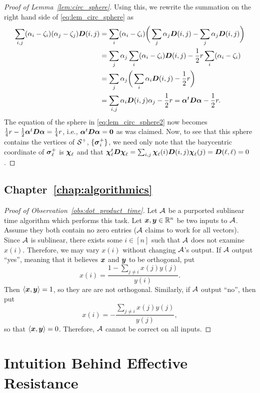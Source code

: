 \begin{proof}[Proof of Lemma~\ref{lem:circ_sphere}]
	Using this, we rewrite the summation on the right hand side of \eqref{eq:lem_circ_sphere} as 
	\begin{align*}
	\sum_{i,j}(\alpha_i-\zeta_i)(\alpha_j-\zeta_j)\vb*{D}(i,j) &= \sum_i (\alpha_i-\zeta_i) \bigg(\sum_j\alpha_j \vb*{D}(i,j) - \sum_j \alpha_j \vb*{D}(i,j)\bigg) \\
	&= \sum_j\alpha_j \sum_i (\alpha_i-\zeta_i)\vb*{D}(i,j) - \frac{1}{2}r \sum_i (\alpha_i-\zeta_i) \\
	&= \sum_j \alpha_j \bigg(\sum_i \alpha_i \vb*{D}(i,j) - \frac{1}{2}r \bigg) \\
	&= \sum_{i,j} \alpha_i \vb*{D}(i,j) \alpha_j -\frac{1}{2}r= \vb*{\alpha}^t \vb*{D}\vb*{\alpha} - \frac{1}{2}r.
	\end{align*}
	The equation of the sphere in \eqref{eq:lem_circ_sphere2} now becomes $\frac{1}{4}r - \frac{1}{2}\vb*{\alpha}^t \vb*{D}\vb*{\alpha} = \frac{1}{4}r$, i.e., $\vb*{\alpha}^t \vb*{D}\vb*{\alpha}=\vb{0}$ as was claimed.  Now, to see that this sphere contains the vertices of $\mathcal{S}^+$,  $\{\vb*{\sigma}_i^+\}$, we need only note that the barycentric coordinate of $\vb*{\sigma}_\ell^+$ is $\boldsymbol{\chi}_\ell$ and that $\boldsymbol{\chi}_\ell^t \vb*{D} \boldsymbol{\chi}_\ell = \sum_{i,j} \boldsymbol{\chi}_\ell(i) \vb*{D}(i,j) \boldsymbol{\chi}_\ell(j) = \vb*{D}(\ell,\ell) = 0$. 
\end{proof}



\section{Chapter~\ref{chap:algorithmics}}
\label{sec:app_proofs_alg}
\begin{proof}[Proof of Observation~\ref{obs:dot_product_time}]
	Let $\mathcal{A}$ be a purported sublinear time algorithm which performs this  task. Let $\vb*{x},\vb*{y}\in\mathbb{R}^n$ be  two inputs  to  $\mathcal{A}$. Assume they  both  contain no zero entries ($\mathcal{A}$ claims to work  for  all vectors). Since  $\mathcal{A}$ is sublinear, there exists some $i\in[n]$ such that $\mathcal{A} $ does not  examine $x(i)$. Therefore,  we may  vary $x(i)$ without changing  $\mathcal{A}$'s  output. If $\mathcal{A}$ output ``yes'', meaning that it believes $\vb*{x}$ and $\vb*{y}$ to be orthogonal, put 
	\[x(i) = \frac{1-\sum_{j\neq i}x(j)y(j)}{y(i)}.\]
	Then  $\langle \vb*{x},\vb*{y}\rangle =1$, so they are are not orthogonal. Similarly,  if $\mathcal{A}$ output ``no'', then put 
	\[x(i) = -\frac{\sum_{j\neq i}x(j)y(j)}{y(j)},\]
	so  that $\langle\vb*{x},\vb*{y}\rangle=0$. Therefore, $\mathcal{A}$ cannot  be  correct on all inputs.  
\end{proof}


\chapter{Intuition Behind Effective Resistance}
\label{sec:app_er}

